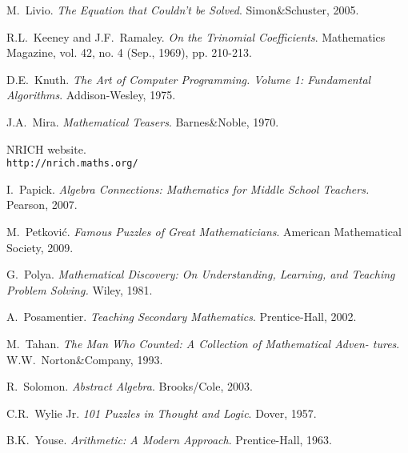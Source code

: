 \begin{fullwidth}
\begin{thebibliography}{99}
 M.\ Livio. \emph{The Equation that Couldn't be
  Solved}. Simon\&Schuster, 2005.

 R.L.\ Keeney and J.F.\ Ramaley. \emph{On the Trinomial Coefficients}. Mathematics Magazine, vol. 42, no. 4 (Sep., 1969), pp. 210-213.

 D.E.\ Knuth. \emph{The Art of Computer Programming. Volume 1: Fundamental Algorithms}. Addison-Wesley, 1975.

 J.A.\ Mira. \emph{Mathematical Teasers}. Barnes\&Noble, 1970.

 NRICH website.
\\ \texttt{http://nrich.maths.org/}

 I.\ Papick. \emph{Algebra Connections: Mathematics
  for Middle School Teachers.} Pearson, 2007.

 M.\ Petkovi\'{c}. \emph{Famous Puzzles of Great Mathematicians}. American Mathematical Society, 2009.

 G.\ Polya. \emph{Mathematical Discovery: On
  Understanding, Learning, and Teaching Problem Solving.} Wiley, 1981.

 A.\ Posamentier. \emph{Teaching Secondary Mathematics}. Prentice-Hall, 2002.

 M.\ Tahan. \emph{The Man Who Counted: A Collection of Mathematical Adven-
tures}. W.W.\ Norton\&Company, 1993.

 R.\ Solomon. \emph{Abstract Algebra}. Brooks/Cole, 2003.

 C.R.\ Wylie Jr. \emph{101 Puzzles in Thought and
  Logic}. Dover, 1957.

 B.K.\ Youse. \emph{Arithmetic: A Modern Approach}. Prentice-Hall, 1963.


\end{thebibliography}
\end{fullwidth}


\printindex


